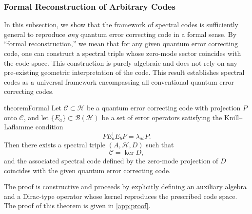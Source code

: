 \documentclass[12pt]{article}
\theoremstyle{definition} %
\theoremstyle{plain} %
\theoremstyle{remark} %
\theoremstyle{underline}
\begin{document}
\subsubsection{Formal Reconstruction of Arbitrary Codes}

In this subsection, we show that the framework of spectral codes is sufficiently general to reproduce \emph{any} quantum error correcting code in a formal sense. By ``formal reconstruction,'' we mean that for any given quantum error correcting code, one can construct a spectral triple whose zero-mode sector coincides with the code space. This construction is purely algebraic and does not rely on any pre-existing geometric interpretation of the code. This result establishes spectral codes as a universal framework encompassing all conventional quantum error correcting codes.

\begin{restatable}{theorem}{Formal}
Let $\mathcal{C}\subset\mathcal{H}$ be a quantum error correcting code with projection $P$ onto $\mathcal{C}$, and let $\{E_a\}\subset\mathcal{B}(\mathcal{H})$ be a set of error operators satisfying the Knill--Laflamme condition
\[
    P E_a^\dagger E_b P = \lambda_{ab} P.
\]
Then there exists a spectral triple $(A,\mathcal{H},D)$ such that
\[
    \mathcal{C} = \ker D,
\]
and the associated spectral code defined by the zero-mode projection of $D$ coincides with the given quantum error correcting code.
\end{restatable}

The proof is constructive and proceeds by explicitly defining an auxiliary algebra and a Dirac-type operator whose kernel reproduces the prescribed code space. The proof of this theorem is given in \ref{app:proof}.



\end{document}
